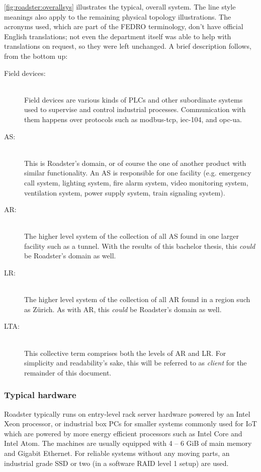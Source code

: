 \autoref{fig:roadster:overallsys} illustrates the typical, overall system. The line
style meanings also apply to the remaining physical topology illustrations. The acronyms
used, which are part of the \gls{FEDRO} terminology, don't have official
English translations; not even the department itself was able to help with
translations on request, so they were left unchanged. A brief description
follows, from the bottom up:

\begin{description}
	\item [ Field devices: ] \hfill\\
	Field devices are various kinds of \glspl{PLC} and other subordinate systems
	used to supervise and control industrial processes. Communication with them
	happens over protocols such as \gls{modbus-tcp}, \gls{iec-104}, and
	\gls{opc-ua}.

	\item [ \gls{AS}: ] \hfill\\
	This is Roadster's domain, or of course the one of another product with similar
	functionality. An AS is responsible for one facility (e.g. emergency call system,
	lighting system, fire alarm system, video monitoring system, ventilation
	system, power supply system, train signaling system).

	\item [ \gls{AR}: ] \hfill\\
	The higher level system of the collection of all AS found in one larger
	facility such as a tunnel. With the results of this bachelor thesis, this
	\emph{could} be Roadster's domain as well.

	\item [ \gls{LR}: ] \hfill\\
	The higher level system of the collection of all AR found in a region such as
	Z\"urich. As with AR, this \emph{could} be Roadster's domain as well.

	\item [ \gls{LTA}: ] \hfill\\
	This collective term comprises both the levels of AR and LR. For
	simplicity and readability's sake, this will be referred to as
	\emph{client} for the remainder of this document.
\end{description}

\subsubsection{Typical hardware}
Roadster typically runs on entry-level rack server hardware powered by an
Intel\textregistered{} Xeon\textregistered{} processor, or industrial box PCs for smaller systems
commonly used for \gls{IoT} which are powered by more energy efficient processors
such as Intel\textregistered{} Core\textregistered{} and Intel\textregistered{}
Atom\texttrademark{}. The machines are usually equipped with 4 -- 6 GiB of main
memory and Gigabit Ethernet. For reliable systems without any moving parts, an
industrial grade \gls{SSD} or two (in a software \gls{RAID} level 1 setup) are used.

